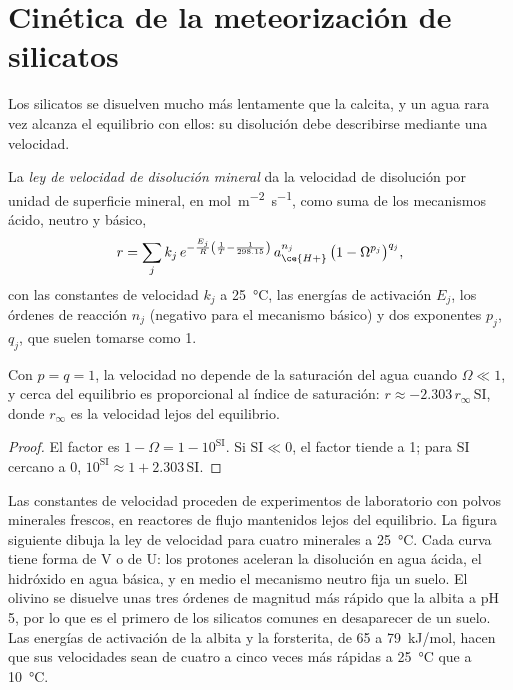 \section{Cinética de la meteorización de silicatos}\label{sec:b3:water-rock-interaction:kinetics}

Los silicatos se disuelven mucho más lentamente que la calcita, y un agua rara vez alcanza
el equilibrio con ellos: su disolución debe describirse mediante una velocidad.

\begin{definition}\label{def:b3:water-rock-interaction:rate-law}
La \emph{ley de velocidad de disolución mineral}
da la velocidad de disolución por unidad de superficie mineral, en
\unit{mol.m^{-2}.s^{-1}}, como suma de los mecanismos ácido, neutro y básico,
\[
r = \sum_j k_j\,e^{-\frac{E_j}{R}\left(\frac1T - \frac1{298.15}\right)}\,
a_{\ce{H+}}^{n_j}\,\bigl(1 - \Omega^{p_j}\bigr)^{q_j},
\]
con las constantes de velocidad $k_j$ a \qty{25}{\celsius}, las energías de activación $E_j$,
los órdenes de reacción $n_j$ (negativo para el mecanismo básico) y dos exponentes
$p_j$, $q_j$, que suelen tomarse como 1.
\end{definition}

\begin{proposition}\label{prop:b3:water-rock-interaction:affinity}
Con $p = q = 1$, la velocidad no depende de la saturación del agua
cuando $\Omega \ll 1$, y cerca del equilibrio es proporcional al
índice de saturación: $r \approx -2.303\,r_\infty\,\mathrm{SI}$, donde
$r_\infty$ es la velocidad lejos del equilibrio.
\end{proposition}

\begin{proof}
El factor es $1 - \Omega = 1 - 10^{\mathrm{SI}}$. Si $\mathrm{SI} \ll 0$, el factor
tiende a 1; para $\mathrm{SI}$ cercano a 0, $10^{\mathrm{SI}} \approx 1 +
2.303\,\mathrm{SI}$.
\end{proof}

Las constantes de velocidad proceden de experimentos de laboratorio con polvos minerales frescos,
en reactores de flujo mantenidos lejos del equilibrio. La figura siguiente dibuja
la ley de velocidad para cuatro minerales a \qty{25}{\celsius}. Cada curva tiene forma de V o de
U: los protones aceleran la disolución en agua ácida, el hidróxido en agua básica, y en
medio el mecanismo neutro fija un suelo. El olivino se disuelve unas tres
órdenes de magnitud más rápido que la albita a pH 5, por lo que es el primero
de los silicatos comunes en desaparecer de un suelo. Las energías de activación de
la albita y la forsterita, de 65 a \qty{79}{kJ/mol}, hacen que sus velocidades sean de cuatro a cinco
veces más rápidas a \qty{25}{\celsius} que a \qty{10}{\celsius}.

